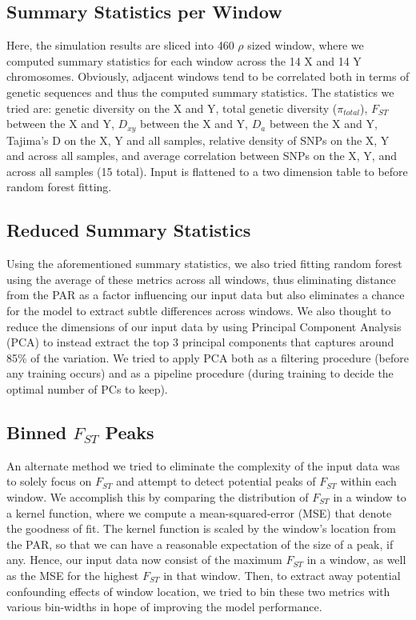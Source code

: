 \documentclass[10pt]{article}
\begin{document}
\subsection{Summary Statistics per Window}

Here, the simulation results are sliced into 460 $\rho$ sized window, where we computed summary statistics for each window across the 14 X and 14 Y chromosomes. Obviously, adjacent windows tend to be correlated both in terms of genetic sequences and thus the computed summary statistics. The statistics we tried are: genetic diversity on the X and Y, total genetic diversity ($\pi_{total}$), $F_{ST}$ between the X and Y, $D_{xy}$ between the X and Y, $D_{a}$ between the X and Y, Tajima's D on the X, Y and all samples, relative density of SNPs on the X, Y and across all samples, and average correlation between SNPs on the X, Y, and across all samples (15 total). Input is flattened to a two dimension table to before random forest fitting. 

\subsection{Reduced Summary Statistics}

Using the aforementioned summary statistics, we also tried fitting random forest using the average of these metrics across all windows, thus eliminating distance from the PAR as a factor influencing our input data but also eliminates a chance for the model to extract subtle differences across windows. We also thought to reduce the dimensions of our input data by using Principal Component Analysis (PCA) to instead extract the top 3 principal components that captures around 85\% of the variation. We tried to apply PCA both as a filtering procedure (before any training occurs) and as a pipeline procedure (during training to decide the optimal number of PCs to keep). 

\subsection{Binned $F_{ST}$ Peaks}

An alternate method we tried to eliminate the complexity of the input data was to solely focus on $F_{ST}$ and attempt to detect potential peaks of $F_{ST}$ within each window. We accomplish this by comparing the distribution of $F_{ST}$ in a window to a kernel function, where we compute a mean-squared-error (MSE) that denote the goodness of fit. The kernel function is scaled by the window's location from the PAR, so that we can have a reasonable expectation of the size of a peak, if any. Hence, our input data now consist of the maximum $F_{ST}$ in a window, as well as the MSE for the highest $F_{ST}$ in that window. Then, to extract away potential confounding effects of window location, we tried to bin these two metrics with various bin-widths in hope of improving the model performance. 
\end{document}

